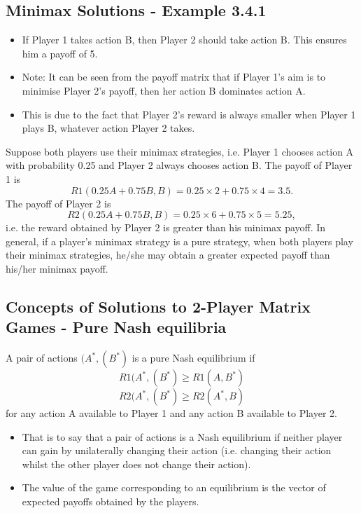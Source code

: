 \documentclass[]{report}
\begin{document}
	\subsection{Minimax Solutions - Example 3.4.1}
	\begin{itemize}
		\item If Player 1 takes action B, then Player 2 should take action B.
		This ensures him a payoff of 5.
		\item Note: It can be seen from the payoff matrix that if Player 1’s aim
		is to minimise Player 2’s payoff, then her action B dominates
		action A.
		\item This is due to the fact that Player 2’s reward is always smaller
		when Player 1 plays B, whatever action Player 2 takes.
	\end{itemize}
	
	Suppose both players use their minimax strategies, i.e. Player 1
	chooses action A with probability 0.25 and Player 2 always chooses
	action B.
	The payoff of Player 1 is
	\[R1(0.25A + 0.75B, B) = 0.25 × 2 + 0.75 × 4 = 3.5.\]
	The payoff of Player 2 is
	\[R2(0.25A + 0.75B, B) = 0.25 × 6 + 0.75 × 5 = 5.25,\] i.e. the
	reward obtained by Player 2 is greater than his minimax payoff.
	In general, if a player’s minimax strategy is a pure strategy, when
	both players play their minimax strategies, he/she may obtain a
	greater expected payoff than his/her minimax payoff.
	\subsection{Concepts of Solutions to 2-Player Matrix Games - Pure
		Nash equilibria}
	A pair of actions $(A^{\ast},(B^{\ast})$ is a pure Nash equilibrium if
\[	R1(A^{\ast},(B^{\ast}) \geq R1(A, B^{\ast}) \]
\[	R2(A^{\ast},(B^{\ast}) \geq R2(A^{\ast}, B) \]
	for any action A available to Player 1 and any action B available
	to Player 2.
	\begin{itemize}
		\item That is to say that a pair of actions is a Nash equilibrium if neither
		player can gain by unilaterally changing their action (i.e. changing
		their action whilst the other player does not change their action).
		\item The value of the game corresponding to an equilibrium is the
		vector of expected payoffs obtained by the players.
	\end{itemize}
	
\end{document}
